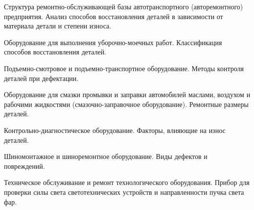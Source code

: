 \documentclass[
	14pt,
	a4paper,
	]
	{scrartcl}
\begin{document}
\vfill
\z Структура ремонтно-обслуживающей базы автотранспортного (авторемонтного) предприятия.
 \vfill
\z Анализ способов восстановления деталей в зависимости от материала детали и степени износа. 
 \vfill

\vfill

\newpage


\shapk
{}
\setcounter{zad}{0}

\vfill
\z Оборудование для выполнения уборочно-моечных работ.
 \vfill
\z Классификация способов восстановления деталей. 
 \vfill

\vfill

\newpage


\shapk
{}
\setcounter{zad}{0}

\vfill
\z Подъемно-смотровое и подъемно-транспортное оборудование.
 \vfill
\z Методы контроля деталей при дефектации. 
 \vfill

\vfill

\newpage


\shapk
{}
\setcounter{zad}{0}

\vfill
\z Оборудование для смазки промывки и заправки автомобилей маслами, воздухом и рабочими жидкостями (смазочно-заправочное оборудование).
 \vfill
\z Ремонтные размеры деталей.
 \vfill

\vfill

\newpage


\shapk
{}
\setcounter{zad}{0}

\vfill
\z Контрольно-диагностическое оборудование.
 \vfill
\z Факторы, влияющие на износ деталей.
 \vfill

\vfill

\newpage


\shapk
{}
\setcounter{zad}{0}

\vfill
\z Шиномонтажное и шиноремонтное оборудование.
 \vfill
\z Виды дефектов и повреждений. 
 \vfill

\vfill

\newpage


\shapk
{}
\setcounter{zad}{0}

\vfill
\z Техническое обслуживание и ремонт технологического оборудования.
 \vfill
\z Прибор для проверки силы света светотехнических устройств и направленности пучка света фар.
 \vfill

\vfill

\newpage
\end{document}
